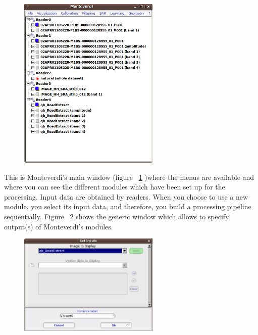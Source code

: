 \begin{figure}
  \center
  \includegraphics[width=0.6\textwidth]{../Art/MonteverdiImages/monteverdi_mainwindow.png}
  \label{fig:mainwindow}
\end{figure}

This is Monteverdi's main window (figure ~\ref{fig:mainwindow} )where the
menus are available and where you can see the different modules which
have been set up for the processing. Input data are obtained by
readers. When you choose to use a new module, you select its input
data, and therefore, you build a processing pipeline sequentially.
Figure ~\ref{fig:inputswindow} shows the generic window which allows to
specify output(s) of Monteverdi's modules.  

\begin{figure} 
  \center
  \includegraphics[width=0.6\textwidth]{../Art/MonteverdiImages/monteverdi_inputs_window.png}
    \label{fig:inputswindow} 
\end{figure} 

